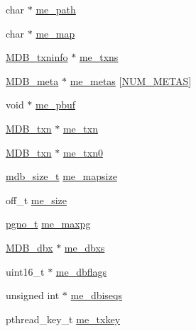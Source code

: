 \begin{DoxyCompactItemize}
\item 
char $\ast$ \mbox{\hyperlink{struct_m_d_b__env_a54e99a5b36b889bda5d78f783f724e13}{me\+\_\+path}}
\item 
char $\ast$ \mbox{\hyperlink{struct_m_d_b__env_a58d7b9c0502757390c1631caa51cf96b}{me\+\_\+map}}
\item 
\mbox{\hyperlink{struct_m_d_b__txninfo}{M\+D\+B\+\_\+txninfo}} $\ast$ \mbox{\hyperlink{struct_m_d_b__env_ae0082e483c3bb1a0d6572d21f7da3010}{me\+\_\+txns}}
\item 
\mbox{\hyperlink{struct_m_d_b__meta}{M\+D\+B\+\_\+meta}} $\ast$ \mbox{\hyperlink{struct_m_d_b__env_a9ff38b60b2d18b585577107ab469592a}{me\+\_\+metas}} \mbox{[}\mbox{\hyperlink{group__internal_gae066f6a2b21f2003b622dc654bc58327}{N\+U\+M\+\_\+\+M\+E\+T\+AS}}\mbox{]}
\item 
void $\ast$ \mbox{\hyperlink{struct_m_d_b__env_a1700deb7f48b9a1837007d82dd47da94}{me\+\_\+pbuf}}
\item 
\mbox{\hyperlink{struct_m_d_b__txn}{M\+D\+B\+\_\+txn}} $\ast$ \mbox{\hyperlink{struct_m_d_b__env_a41f4abc70ee54d822f4674d48d4c4461}{me\+\_\+txn}}
\item 
\mbox{\hyperlink{struct_m_d_b__txn}{M\+D\+B\+\_\+txn}} $\ast$ \mbox{\hyperlink{struct_m_d_b__env_a6981326b3defd1cd688922f896a1b279}{me\+\_\+txn0}}
\item 
\mbox{\hyperlink{lmdb_8h_a78821971e612e3898ef4b3ae45ed86f1}{mdb\+\_\+size\+\_\+t}} \mbox{\hyperlink{struct_m_d_b__env_a98bb1536454549ec21407c4cf376a6dd}{me\+\_\+mapsize}}
\item 
off\+\_\+t \mbox{\hyperlink{struct_m_d_b__env_ad6d73a08b30a6c370cefb129ee2313d8}{me\+\_\+size}}
\item 
\mbox{\hyperlink{group__internal_gadb65f0424c9d3827bf6409087ad555cd}{pgno\+\_\+t}} \mbox{\hyperlink{struct_m_d_b__env_a898e1efb92a2cdfe352dfdb6f6dfbc40}{me\+\_\+maxpg}}
\item 
\mbox{\hyperlink{struct_m_d_b__dbx}{M\+D\+B\+\_\+dbx}} $\ast$ \mbox{\hyperlink{struct_m_d_b__env_a3de13263d5176b1985c3581c4c728ed7}{me\+\_\+dbxs}}
\item 
uint16\+\_\+t $\ast$ \mbox{\hyperlink{struct_m_d_b__env_a84e30bf602ca2810dc1f5ff8a474b86d}{me\+\_\+dbflags}}
\item 
unsigned int $\ast$ \mbox{\hyperlink{struct_m_d_b__env_a7fd1b52643fcf729f927469d28d1b1c4}{me\+\_\+dbiseqs}}
\item 
pthread\+\_\+key\+\_\+t \mbox{\hyperlink{struct_m_d_b__env_a2f9ec605ad2ed099b970527d9aabb786}{me\+\_\+txkey}}
\item 

\end{DoxyCompactItemize}
